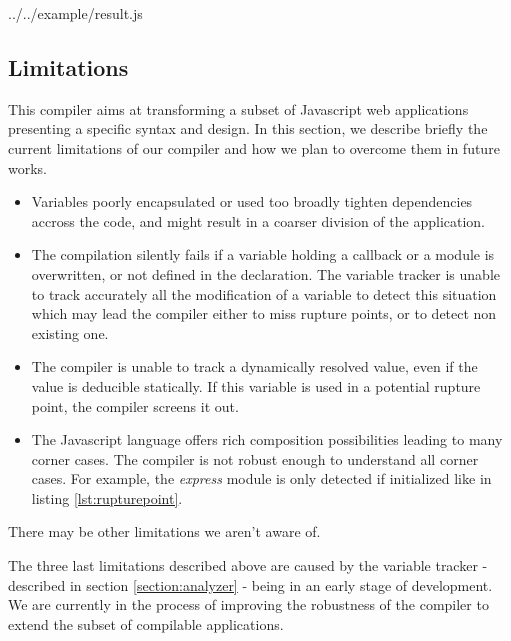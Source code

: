 {../../example/result.js}

\subsection{Limitations}

This compiler aims at transforming a subset of Javascript web applications presenting a specific syntax and design.
In this section, we describe briefly the current limitations of our compiler and how we plan to overcome them in future works.

\begin{itemize}
  \item Variables poorly encapsulated or used too broadly tighten dependencies accross the code, and might result in a coarser division of the application.
  \item The compilation silently fails if a variable holding a callback or a module is overwritten, or not defined in the declaration.
        The variable tracker is unable to track accurately all the modification of a variable to detect this situation which may lead the compiler either to miss rupture points, or to detect non existing one.
  \item The compiler is unable to track a dynamically resolved value, even if the value is deducible statically.
        If this variable is used in a potential rupture point, the compiler screens it out.
  \item The Javascript language offers rich composition possibilities leading to many corner cases.
        The compiler is not robust enough to understand all corner cases.
        For example, the \textit{express} module is only detected if initialized like in listing \ref{lst:rupturepoint}.
\end{itemize}
There may be other limitations we aren't aware of.

The three last limitations described above are caused by the variable tracker - described in section \ref{section:analyzer} - being in an early stage of development.
We are currently in the process of improving the robustness of the compiler to extend the subset of compilable applications.

